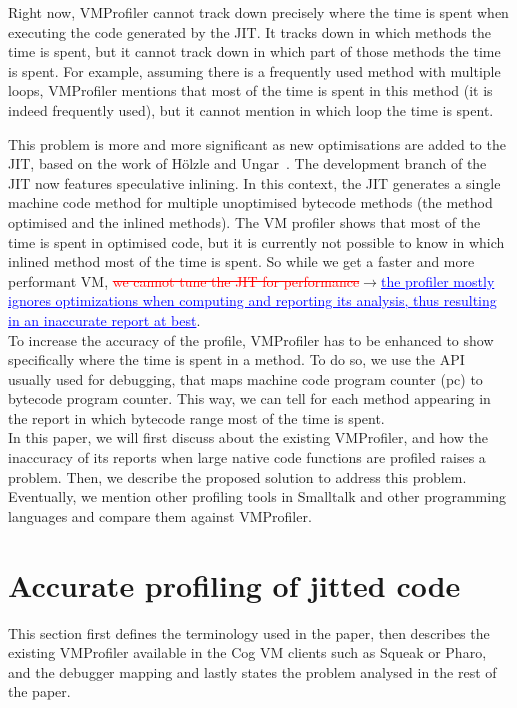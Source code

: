 \documentclass[10pt,preprint,nonatbib]{sigplanconf}
\newcommand{\ra}{$\rightarrow$}
\newcommand{\chg}[2]{\textcolor{red}{\sout{#1}}{\ra}\textcolor{blue}{\uline{#2}}} %
\begin{document}
Right now, VMProfiler cannot track down precisely where the time is spent when executing the code generated by the JIT. It tracks down in which methods the time is spent, but it cannot track down in which part of those methods the time is spent. For example, assuming there is a frequently used method with multiple loops, VMProfiler mentions that most of the time is spent in this method (it is indeed frequently used), but it cannot mention in which loop the time is spent.

This problem is more and more significant as new optimisations are added to the JIT, based on the work of H\"olzle and Ungar~\cite{Holz94a}. The development branch of the JIT now features speculative inlining. In this context, the JIT generates a single machine code method for multiple unoptimised bytecode methods (the method optimised and the inlined methods). The VM profiler shows that most of the time is spent in optimised code, but it is currently not possible to know in which inlined method most of the time is spent. So while we get a faster and more performant VM, \chg{we cannot tune the JIT for performance}{the profiler mostly ignores optimizations when computing and reporting its analysis, thus resulting in an inaccurate report at best}.\\

To increase the accuracy of the profile, VMProfiler has to be enhanced to show specifically where the time is spent in a method. To do so, we use the API usually used for debugging, that maps machine code program counter (pc) to bytecode program counter. This way, we can tell for each method appearing in the report in which bytecode range most of the time is spent.\\

In this paper, we will first discuss about the existing VMProfiler, and how the inaccuracy of its reports  when large native code functions are profiled raises a problem. Then, we describe the proposed solution to address this problem. Eventually, we mention other profiling tools in Smalltalk and other programming languages and compare them against VMProfiler.



\section{Accurate profiling of jitted code}

This section first defines the terminology used in the paper, then describes the existing VMProfiler available in the Cog VM clients such as Squeak or Pharo, and the debugger mapping and lastly states the problem analysed in the rest of the paper.
\end{document}
